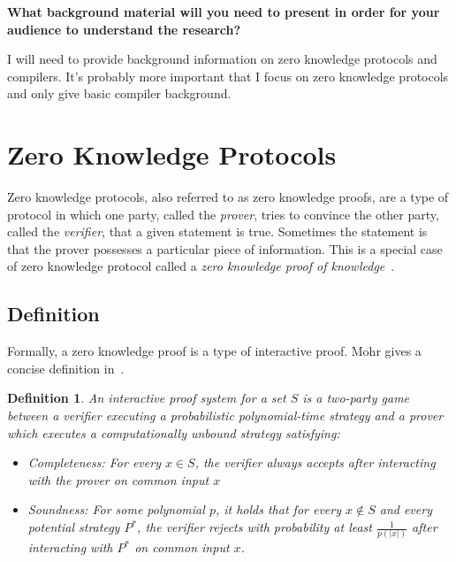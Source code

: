 \documentclass{sig-alternate}
\newtheorem{interactiveProof}{Definition}
\begin{document}
	\textbf{What background material will you need to present in order for your audience to understand the research?}
	
	I will need to provide background information on zero knowledge protocols and
	compilers. It's probably more important that I focus on zero knowledge protocols and
	only give basic compiler background.
	


\section{Zero Knowledge Protocols}
	Zero knowledge protocols, also referred to as zero knowledge proofs, are a type
	of protocol in which one party, called the \textit{prover}, tries to convince the 
	other party, called the \textit{verifier}, that a given statement is true. Sometimes
	the statement is that the prover possesses a particular piece of information. This
	is a special case of zero knowledge protocol called a \textit{zero knowledge proof
	of knowledge}~\cite{Wiki}.
	
	\subsection{Definition}
		Formally, a zero knowledge proof is a type of interactive proof. Mohr gives
		a concise definition in~\cite{Survey}.
	
		\begin{interactiveProof}
			An interactive proof system for a set $S$ is a two-party game between a
			\textit{verifier} executing a probabilistic polynomial-time strategy and
			a \textit{prover} which executes a computationally unbound strategy 
			satisfying:
			
			\begin{itemize}
				\item \textit{Completeness}: For every $ x \in S$, the verifier always
				accepts after interacting with the prover on common input $x$
				
				\item \textit{Soundness}: For some polynomial $p$, it holds that for
				every $x \notin S$ and every potential strategy $P^{*}$, the verifier
				rejects with probability at least $\frac{1}{p(|x|)}$ after interacting
				with $P^{*}$ on common input $x$.
			\end{itemize}
			
		\end{interactiveProof}
		
\end{document}
